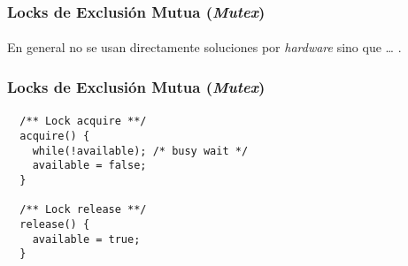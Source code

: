 \documentclass[letter]{beamer}
\begin{document}
\begin{frame}
  \frametitle{Locks de Exclusión Mutua ({\em Mutex}) }
  \framesubtitle{}

  En general no se usan directamente soluciones por {\em hardware} sino que \ldots
  .
  



\end{frame}

\begin{frame}[fragile]
  \frametitle{Locks de Exclusión Mutua ({\em Mutex}) }
  \framesubtitle{}

\begin{verbatim}
  /** Lock acquire **/
  acquire() {
    while(!available); /* busy wait */
    available = false;
  }

  /** Lock release **/
  release() {
    available = true;
  }
\end{verbatim}


\end{frame}
\end{document}
